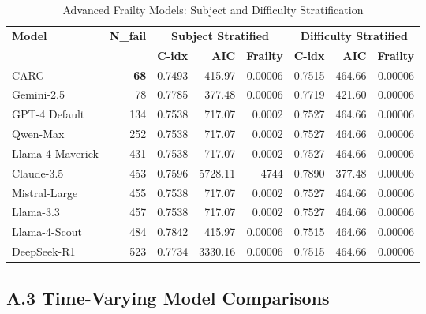 \documentclass[letterpaper]{article}
\begin{document}
\begin{table}[ht]
\centering
\caption{Advanced Frailty Models: Subject and Difficulty Stratification}
\label{tab:frailty_complete}
\begin{tabular}{lrrrrrrr}
\toprule
\multirow{2}{*}{\textbf{Model}} & \multirow{2}{*}{\textbf{N\_fail}} & \multicolumn{3}{c}{\textbf{Subject Stratified}} & \multicolumn{3}{c}{\textbf{Difficulty Stratified}} \\
\cmidrule(lr){3-5} \cmidrule(lr){6-8}
& & \textbf{C-idx} & \textbf{AIC} & \textbf{Frailty} & \textbf{C-idx} & \textbf{AIC} & \textbf{Frailty} \\
\midrule
CARG & \textbf{68} & 0.7493 & 415.97 & 0.00006 & 0.7515 & 464.66 & 0.00006 \\
Gemini-2.5 & 78 & 0.7785 & 377.48 & 0.00006 & 0.7719 & 421.60 & 0.00006 \\
GPT-4 Default & 134 & 0.7538 & 717.07 & 0.0002 & 0.7527 & 464.66 & 0.00006 \\
Qwen-Max & 252 & 0.7538 & 717.07 & 0.0002 & 0.7527 & 464.66 & 0.00006 \\
Llama-4-Maverick & 431 & 0.7538 & 717.07 & 0.0002 & 0.7527 & 464.66 & 0.00006 \\
Claude-3.5 & 453 & 0.7596 & 5728.11 & 4744 & 0.7890 & 377.48 & 0.00006 \\
Mistral-Large & 455 & 0.7538 & 717.07 & 0.0002 & 0.7527 & 464.66 & 0.00006 \\
Llama-3.3 & 457 & 0.7538 & 717.07 & 0.0002 & 0.7527 & 464.66 & 0.00006 \\
Llama-4-Scout & 484 & 0.7842 & 415.97 & 0.00006 & 0.7515 & 464.66 & 0.00006 \\
DeepSeek-R1 & 523 & 0.7734 & 3330.16 & 0.00006 & 0.7515 & 464.66 & 0.00006 \\
\bottomrule
\end{tabular}
\end{table}

\subsection*{A.3 Time-Varying Model Comparisons}
\end{document}
